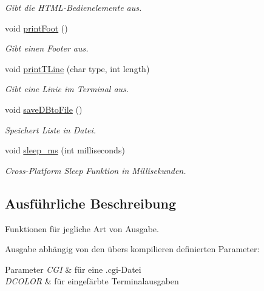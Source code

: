\begin{DoxyCompactItemize}
\begin{DoxyCompactList}\small\item\em Gibt die H\+T\+M\+L-\/\+Bedienelemente aus. \end{DoxyCompactList}\item 
void \hyperlink{group___lend_lib_out_gaa5964f653524972b1bca64e6e8a7622d}{print\+Foot} ()
\begin{DoxyCompactList}\small\item\em Gibt einen Footer aus. \end{DoxyCompactList}\item 
void \hyperlink{group___lend_lib_out_ga5a511942adfe4ce80256d665208eb204}{print\+T\+Line} (char type, int length)
\begin{DoxyCompactList}\small\item\em Gibt eine Linie im Terminal aus. \end{DoxyCompactList}\item 
void \hyperlink{group___lend_lib_out_gaf8d2a2570c703c30713860b4b060cae0}{save\+D\+Bto\+File} ()\hypertarget{group___lend_lib_out_gaf8d2a2570c703c30713860b4b060cae0}{}\label{group___lend_lib_out_gaf8d2a2570c703c30713860b4b060cae0}

\begin{DoxyCompactList}\small\item\em Speichert Liste in Datei. \end{DoxyCompactList}\item 
void \hyperlink{group___lend_lib_out_ga73a8d7e98be85f67961ca682c291033a}{sleep\+\_\+ms} (int milliseconds)
\begin{DoxyCompactList}\small\item\em Cross-\/\+Platform Sleep Funktion in Millisekunden. \end{DoxyCompactList}\end{DoxyCompactItemize}


\subsection{Ausführliche Beschreibung}
Funktionen für jegliche Art von Ausgabe. 

Ausgabe abhängig von den übers kompilieren definierten Parameter\+: 
\begin{DoxyParams}{Parameter}
{\em C\+GI} & für eine .cgi-\/\+Datei \\
\hline
{\em D\+C\+O\+L\+OR} & für eingefärbte Terminalausgaben \\
\hline
\end{DoxyParams}


